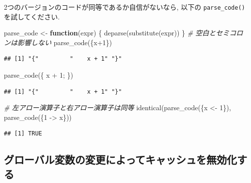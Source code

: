 \documentclass[
  11pt,
  lualatex,
  ja=standard]{bxjsreport}
\newenvironment{Shaded}{\begin{snugshade}}{\end{snugshade}}
\newcommand{\CommentTok}[1]{\textcolor[rgb]{0.56,0.35,0.01}{\textit{#1}}}
\newcommand{\ControlFlowTok}[1]{\textcolor[rgb]{0.13,0.29,0.53}{\textbf{#1}}}
\newcommand{\DecValTok}[1]{\textcolor[rgb]{0.00,0.00,0.81}{#1}}
\newcommand{\FunctionTok}[1]{\textcolor[rgb]{0.00,0.00,0.00}{#1}}
\newcommand{\NormalTok}[1]{#1}
\newcommand{\OtherTok}[1]{\textcolor[rgb]{0.56,0.35,0.01}{#1}}
\newcommand{\SpecialCharTok}[1]{\textcolor[rgb]{0.00,0.00,0.00}{#1}}
\begin{document}
2つのバージョンのコードが同等であるか自信がないなら, 以下の \texttt{parse\_code()} を試してください.

\begin{Shaded}
\begin{Highlighting}[numbers=left,,]
\NormalTok{parse\_code }\OtherTok{\textless{}{-}} \ControlFlowTok{function}\NormalTok{(expr) \{}
  \FunctionTok{deparse}\NormalTok{(}\FunctionTok{substitute}\NormalTok{(expr))}
\NormalTok{\}}
\CommentTok{\# 空白とセミコロンは影響しない}
\FunctionTok{parse\_code}\NormalTok{(\{x}\SpecialCharTok{+}\DecValTok{1}\NormalTok{\})}
\end{Highlighting}
\end{Shaded}

\begin{verbatim}
## [1] "{"         "    x + 1" "}"
\end{verbatim}

\begin{Shaded}
\begin{Highlighting}[numbers=left,,]
\FunctionTok{parse\_code}\NormalTok{(\{ x   }\SpecialCharTok{+}    \DecValTok{1}\NormalTok{; \})}
\end{Highlighting}
\end{Shaded}

\begin{verbatim}
## [1] "{"         "    x + 1" "}"
\end{verbatim}

\begin{Shaded}
\begin{Highlighting}[numbers=left,,]
\CommentTok{\# 左アロー演算子と右アロー演算子は同等}
\FunctionTok{identical}\NormalTok{(}\FunctionTok{parse\_code}\NormalTok{(\{x }\OtherTok{\textless{}{-}} \DecValTok{1}\NormalTok{\}), }\FunctionTok{parse\_code}\NormalTok{(\{}\DecValTok{1} \OtherTok{{-}\textgreater{}}\NormalTok{ x\}))}
\end{Highlighting}
\end{Shaded}

\begin{verbatim}
## [1] TRUE
\end{verbatim}

\hypertarget{ux30b0ux30edux30fcux30d0ux30ebux5909ux6570ux306eux5909ux66f4ux306bux3088ux3063ux3066ux30adux30e3ux30c3ux30b7ux30e5ux3092ux7121ux52b9ux5316ux3059ux308b}{%
\subsection{グローバル変数の変更によってキャッシュを無効化する}\label{ux30b0ux30edux30fcux30d0ux30ebux5909ux6570ux306eux5909ux66f4ux306bux3088ux3063ux3066ux30adux30e3ux30c3ux30b7ux30e5ux3092ux7121ux52b9ux5316ux3059ux308b}}
\end{document}
